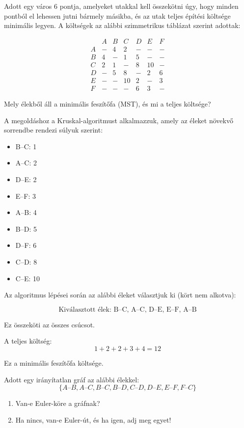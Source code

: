 \begin{extraproblem}
Adott egy város 6 pontja, amelyeket utakkal kell összekötni úgy,
hogy minden pontból el lehessen jutni bármely másikba, és az utak
teljes építési költsége minimális legyen. A költségek az alábbi szimmetrikus
táblázat szerint adottak:

\[
\begin{array}{c|cccccc}
 & A & B & C & D & E & F\\
\hline A & - & 4 & 2 & - & - & -\\
B & 4 & - & 1 & 5 & - & -\\
C & 2 & 1 & - & 8 & 10 & -\\
D & - & 5 & 8 & - & 2 & 6\\
E & - & - & 10 & 2 & - & 3\\
F & - & - & - & 6 & 3 & -
\end{array}
\]

Mely élekből áll a minimális feszítőfa (MST), és mi a teljes költsége? 
\end{extraproblem}

\vspace{1em}

\begin{solution}
A megoldáshoz a Kruskal-algoritmust alkalmazzuk, amely az éleket növekvő
sorrendbe rendezi súlyuk szerint:
\begin{itemize}
\item B--C: 1 
\item A--C: 2 
\item D--E: 2 
\item E--F: 3 
\item A--B: 4 
\item B--D: 5 
\item D--F: 6 
\item C--D: 8 
\item C--E: 10 
\end{itemize}
Az algoritmus lépései során az alábbi éleket választjuk ki (kört nem
alkotva):

\[
\text{Kiválasztott élek: B–C, A–C, D–E, E–F, A–B}
\]

Ez összeköti az összes csúcsot.

A teljes költség: 
\[
1+2+2+3+4=\boxed{12}
\]

Ez a minimális feszítőfa költsége. 
\end{solution}
\vspace{1em}

\begin{extraproblem}
Adott egy irányítatlan gráf az alábbi élekkel: 
\[
\{A\text{–}B,A\text{–}C,B\text{–}C,B\text{–}D,C\text{–}D,D\text{–}E,E\text{–}F,F\text{–}C\}
\]
\begin{enumerate}
\item Van-e Euler-köre a gráfnak? 
\item Ha nincs, van-e Euler-út, és ha igen, adj meg egyet! 
\end{enumerate}
\end{extraproblem}

